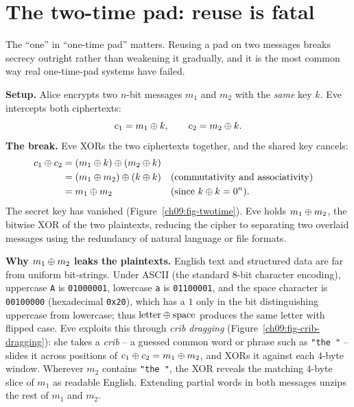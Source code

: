 \section{The two-time pad: reuse is fatal}
\label{ch09:two-time}

The ``one'' in ``one-time pad'' matters. Reusing a pad on two messages breaks secrecy outright rather than weakening it gradually, and it is the most common way real one-time-pad systems have failed.

\begin{attackbox}
\textbf{Setup.} Alice encrypts two $n$-bit messages $m_1$ and $m_2$ with the \emph{same} key $k$. Eve intercepts both ciphertexts:
\[
  c_1 = m_1 \oplus k, \qquad c_2 = m_2 \oplus k.
\]
\textbf{The break.} Eve XORs the two ciphertexts together, and the shared key cancels:
\begin{align*}
  c_1 \oplus c_2 &= (m_1 \oplus k) \oplus (m_2 \oplus k) \\
               &= (m_1 \oplus m_2) \oplus (k \oplus k) && \text{(commutativity and associativity)} \\
               &= m_1 \oplus m_2 && \text{(since $k \oplus k = 0^n$)}.
\end{align*}
The secret key has vanished (Figure~\ref{ch09:fig-twotime}). Eve holds $m_1 \oplus m_2$, the bitwise XOR of the two plaintexts, reducing the cipher to separating two overlaid messages using the redundancy of natural language or file formats.

\textbf{Why $m_1 \oplus m_2$ leaks the plaintexts.} English text and structured data are far from uniform bit-strings. Under ASCII (the standard $8$-bit character encoding), uppercase \texttt{A} is \texttt{01000001}, lowercase \texttt{a} is \texttt{01100001}, and the space character is \texttt{00100000} (hexadecimal \texttt{0x20}), which has a $1$ only in the bit distinguishing uppercase from lowercase; thus $\text{letter} \oplus \text{space}$ produces the same letter with flipped case. Eve exploits this through \emph{crib dragging} (Figure~\ref{ch09:fig-crib-dragging}): she takes a \emph{crib} -- a guessed common word or phrase such as \texttt{"the~"} -- slides it across positions of $c_1 \oplus c_2 = m_1 \oplus m_2$, and XORs it against each $4$-byte window. Wherever $m_2$ contains \texttt{"the~"}, the XOR reveals the matching $4$-byte slice of $m_1$ as readable English. Extending partial words in both messages unzips the rest of $m_1$ and $m_2$.
\end{attackbox}

